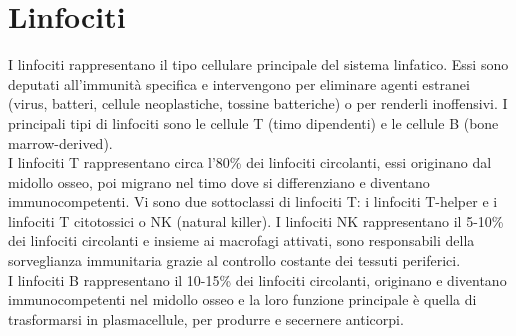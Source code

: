 \section{Linfociti}
I linfociti rappresentano il tipo cellulare principale del sistema linfatico. 
Essi sono deputati all'immunità specifica e intervengono per eliminare agenti estranei 
(virus, batteri, cellule neoplastiche, tossine batteriche) o per renderli inoffensivi. 
I principali tipi di linfociti sono le cellule T (timo dipendenti) e le cellule B (bone marrow-derived)\cite{BOOK2}.\\
I linfociti T rappresentano circa l’80\% dei linfociti circolanti, essi originano dal midollo osseo, 
poi migrano nel timo dove si differenziano e diventano immunocompetenti. 
Vi sono due sottoclassi di linfociti T: i linfociti T-helper e i linfociti T citotossici o NK (natural killer). 
I linfociti NK rappresentano il 5-10\% dei linfociti circolanti e insieme ai macrofagi attivati, 
sono responsabili della sorveglianza immunitaria grazie al controllo costante dei tessuti periferici.\\
I linfociti B rappresentano il 10-15\% dei linfociti circolanti, originano e diventano immunocompetenti 
nel midollo osseo e la loro funzione principale è quella di trasformarsi in plasmacellule, 
per produrre e secernere anticorpi\cite{BOOK2}.\\   

